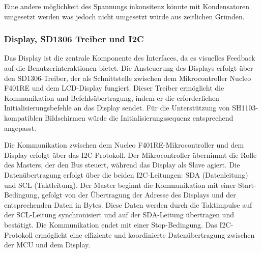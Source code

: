Eine andere möglichkeit des Spannungs inkonsitenz könnte mit Kondensatoren umgesetzt werden was jedoch nicht umgesetzt würde aus zeitlichen Gründen.

\subsubsection{Display, SD1306 Treiber und I2C}
Das Display ist die zentrale Komponente des Interfaces, da es visuelles Feedback auf die Benutzerinteraktionen bietet. Die Ansteuerung des Displays erfolgt über den SD1306-Treiber, der als Schnittstelle zwischen dem Mikrocontroller Nucleo F401RE und dem LCD-Display fungiert. Dieser Treiber ermöglicht die Kommunikation und Befehlsübertragung, indem er die erforderlichen Initialisierungsbefehle an das Display sendet. Für die Unterstützung von SH1103-kompatiblen Bildschirmen würde die Initialisierungssequenz entsprechend angepasst.

Die Kommunikation zwischen dem Nucleo F401RE-Mikrocontroller und dem Display erfolgt über das I2C-Protokoll. Der Mikrocontroller übernimmt die Rolle des Masters, der den Bus steuert, während das Display als Slave agiert. Die Datenübertragung erfolgt über die beiden I2C-Leitungen: SDA (Datenleitung) und SCL (Taktleitung). Der Master beginnt die Kommunikation mit einer Start-Bedingung, gefolgt von der Übertragung der Adresse des Displays und der entsprechenden Daten in Bytes. Diese Daten werden durch die Taktimpulse auf der SCL-Leitung synchronisiert und auf der SDA-Leitung übertragen und bestätigt. Die Kommunikation endet mit einer Stop-Bedingung. Das I2C-Protokoll ermöglicht eine effiziente und koordinierte Datenübertragung zwischen der MCU und dem Display.






